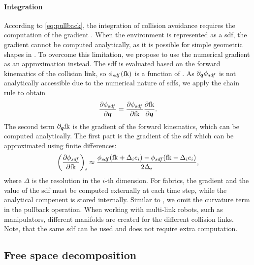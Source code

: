 \paragraph{Integration}
According 
to \cref{eq:pullback}, the integration of collision
avoidance requires the computation of the gradient \J{}.
When the environment is represented as a \ac{sdf}, the gradient cannot be
computed analytically, as it is possible for simple geometric shapes in
\cite{Ratliff2021,Spahn2023}. To overcome this limitation, we propose to
use the numerical gradient as an approximation instead.
The \ac{sdf} is evaluated based on the forward kinematics of the collision link,
so $\phi_{sdf}(\textrm{fk})$ is a function of \q{}.
As $\partial_{\bm{q}}\phi_{sdf}$ is not analytically accessible due to the numerical
nature of \acp{sdf}, we apply the chain rule to obtain
\[
  \frac{\partial\phi_{sdf}}{\partial\bm{q}} = \frac{\partial\phi_{sdf}}{\partial\textrm{fk}}\frac{\partial\textrm{fk}}{\partial\bm{q}}.
\]
The second term $\partial_{\bm{q}}\textrm{fk}$ is the gradient of the forward
kinematics, which can be computed analytically. The first part is the gradient
of the \ac{sdf} which can be
approximated using finite differences:
\[
  \left(\frac{\partial\phi_{sdf}}{\partial\textrm{fk}}\right)_i \approx 
  \frac{\phi_{sdf}(\textrm{fk} + \Delta_i e_i) - \phi_{sdf}(\textrm{fk} - \Delta_i e_i)}{2 \Delta_i},
\]
where $\Delta$ is the resolution in the $i$-th dimension. For 
\ac{fabrics}, the gradient and the value of the \ac{sdf} must be computed externally
at each time step, while the analytical compenent is stored internally. Similar
to \cite{Ratliff2021}, we omit the curvature term \Jdot{} in the pullback
operation.
%
When working with multi-link robots, such as manipulators, different manifolds
are created for the different collision links. Note, that
the same \ac{sdf}
can be used and does not require extra computation.

\subsection{Free space decomposition}
\label{sub:Free Space Decomposition}

